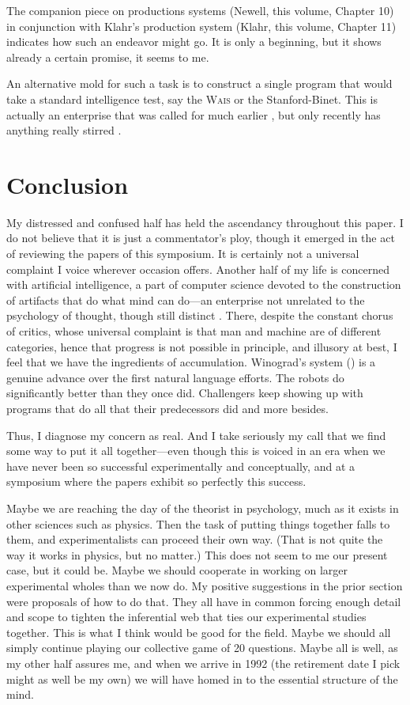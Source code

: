 \documentclass{paper}
\newcounter{oldpagecounter}
\newcommand\oldpage{\stepcounter{oldpagecounter}\marginpar{\footnotesize{\textcolor{mygrey}{pg. \arabic{oldpagecounter}}}}}
\begin{document}
The companion piece on productions systems (Newell, this volume, Chapter 10) in conjunction with Klahr's production system (Klahr, this volume, Chapter 11) indicates how such an endeavor might go. It is only a beginning, but it shows already a certain promise, it seems to me.

An alternative mold for such a task is to construct a single program that would take a standard intelligence test, say the \textsc{Wais} or the Stanford-Binet. This is actually an enterprise that was called for much earlier \citep{Green1964}, but only recently has anything really stirred \citep{HuntFrostLunneborg1973}.

\section*{Conclusion}
My distressed and confused half has held the ascendancy throughout this paper. I do not believe that it is just a commentator's ploy, though it emerged in the act of reviewing the papers of this symposium. It is certainly not a universal complaint I voice wherever occasion offers. Another half of my life is concerned with artificial intelligence, a part of computer science devoted to the construction of artifacts that do what mind can do---an enterprise not unrelated to the psychology of thought, though still distinct \citep{Newell1970}. There, despite the constant chorus of critics, whose universal complaint is that man and machine are of different categories, hence that progress is not possible in principle, and illusory at best, I feel that we have the ingredients of accumulation. Winograd's system (\citeyear{Winograd1972}) is a genuine advance \oldpage over the first natural language efforts. The robots do significantly better than they once did. Challengers keep showing up with programs that do all that their predecessors did and more besides.

Thus, I diagnose my concern as real. And I take seriously my call that we find some way to put it all together---even though this is voiced in an era when we have never been so successful experimentally and conceptually, and at a symposium where the papers exhibit so perfectly this success.

Maybe we are reaching the day of the theorist in psychology, much as it exists in other sciences such as physics. Then the task of putting things together falls to them, and experimentalists can proceed their own way. (That is not quite the way it works in physics, but no matter.) This does not seem to me our present case, but it could be. Maybe we should cooperate in working on larger experimental wholes than we now do. My positive suggestions in the prior section were proposals of how to do that. They all have in common forcing enough detail and scope to tighten the inferential web that ties our experimental studies together. This is what I think would be good for the field. Maybe we should all simply continue playing our collective game of 20 questions. Maybe all is well, as my other half assures me, and when we arrive in 1992 (the retirement date I pick might as well be my own) we will have homed in to the essential structure of the mind.
\end{document}
